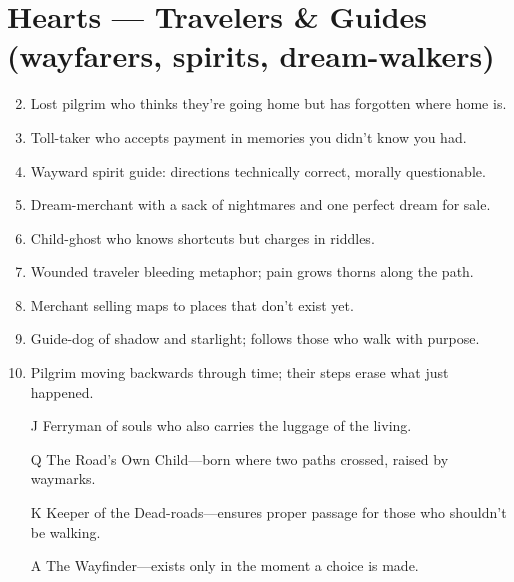 \section*{Hearts --- Travelers \& Guides (wayfarers, spirits, dream-walkers)}
\label{sec:ways-between-people}
\begin{enumerate}
\setcounter{enumi}{1}
\item Lost pilgrim who thinks they're going home but has forgotten where home is.
\item Toll-taker who accepts payment in memories you didn't know you had.
\item Wayward spirit guide: directions technically correct, morally questionable.
\item Dream-merchant with a sack of nightmares and one perfect dream for sale.
\item Child-ghost who knows shortcuts but charges in riddles.
\item Wounded traveler bleeding metaphor; pain grows thorns along the path.
\item Merchant selling maps to places that don't exist yet.
\item Guide-dog of shadow and starlight; follows those who walk with purpose.
\item Pilgrim moving backwards through time; their steps erase what just happened.
\item[J] Ferryman of souls who also carries the luggage of the living.
\item[Q] The Road's Own Child---born where two paths crossed, raised by waymarks.
\item[K] Keeper of the Dead-roads---ensures proper passage for those who shouldn't be walking.
\item[A] The Wayfinder---exists only in the moment a choice is made.
\end{enumerate}

